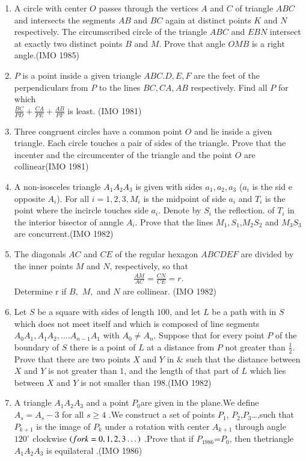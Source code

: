 \begin{enumerate}
\item A circle with center $O$ passes through the vertices $A$ and $C$ of triangle $ABC$ and intersects the segments $AB$ and $BC$ again at distinct points $K$ and $N$ respectively. The circumscribed circle of the triangle $ABC$ and $EBN$ intersect at exactly two distinct points $B$ and $M$. Prove that angle $OMB$ is a right angle.\hfill(IMO 1985)
\item $P$ is a point inside a given triangle $ABC.D, E, F$ are the feet of the perpendiculars from $P$ to the lines $BC, CA, AB$ respectively. Find all $P$ for which \\ $\frac{BC}{PD}+\frac{CA}{PE}+\frac{AB}{PF}$ is least. \hfill(IMO 1981)
\item Three congruent circles have a common point $O$ and lie inside     a given triangle. Each circle touches a pair of sides of the triangle. Prove that the incenter and the circumcenter of the triangle and   the point $O$  are collinear\hfill(IMO 1981)     
\item A non-isosceles triangle $A_1 A_2 A_3$ is given with sides $a_1,a_2,a_3$ ($a_i$ is the sid    e opposite $A_i$). For all $i = 1, 2, 3, M_i$ is the midpoint of side $a_i$ and $T_i$ is the point where     the incircle touches side $a_i$. Denote by $S_i$ the reflection. of $T_i$ in the interior bisector of anngle $A_i$. Prove that the lines $M_1,S_1$,$ M_2S_2$ and $M_3S_3$ are concurrent.\hfill(IMO 1982)
 \item The diagonals $AC$ and $CE$ of the regular hexagon $ABCDEF$ are divided by the inner points $M$ and $N$, respectively, so that \begin{align*} \frac{AM}{AC}=\frac{CN}{CE}=r.
                   \end{align*}
 Determine r if $B,$ $M,$ and $N$ are collinear. \hfill(IMO 1982)
 \item Let $S$ be a square with sides of length $100$, and let $L$ be a path with in $S$ which does not meet itself and which is composed of line segments $A_0A_1, A_1A_2,.... A_{n-1}A_1$ with $A_0 \neq A_n$.     Suppose that for every point $P$ of the boundary of $S$ there is a point of $L$ at a distance from $P$ not greater than $\frac{1}{2}$. Prove that there are two points $X$ and $Y$ in  $\&$ such that the distance between $X$ and $Y$ is not greater than $1$, and the length of that part of $L$ which lies between $X$ and $Y$ is not smaller than $198$.\hfill(IMO 1982)
\item A triangle $A_1A_2A_3$ and a point $P_0 $are given in the plane.We define $A_s
    =A_s-3$ for all $s\geq4$ .We construct a set of points $P_1$, $P_2$,$P_3$\dots,such that $P_{k+1}$ is the image of $P_k$ under a rotation with center $A_{k+1}$ through angle $120^\circ$ clockwise $\left(for \space k=0,1,2,3\dots\right)$ .Prove that if $P_{1986}$=$P_0$, then thetriangle $A_1A_2A_3$ is equilateral .\hfill(IMO 1986)


\end{enumerate}
